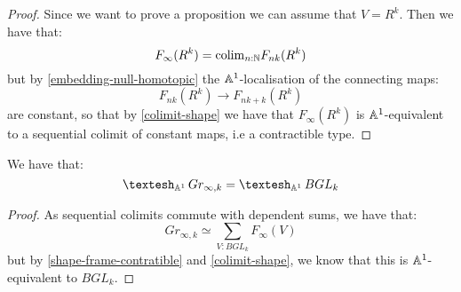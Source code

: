 \begin{proof}
Since we want to prove a proposition we can assume that $V=R^k$. Then we have that:
\[F_\infty(R^k) = \mathrm{colim}_{n:\mathbb{N}} F_{nk}(R^k)\]
but by \cref{embedding-null-homotopic} the $\mathbb{A}^1$-localisation of the connecting maps:
\[F_{nk}(R^k)\to F_{nk + k}(R^k)\]
are constant, so that by \cref{colimit-shape} we have that $F_\infty(R^k)$ is $\mathbb{A}^1$-equivalent to a sequential colimit of constant maps, i.e a contractible type.
\end{proof}

\begin{proposition}
We have that:
\[\shape_{\A^1} Gr_{\infty,k} = \shape_{\A^1} BGL_k\]
\end{proposition}

\begin{proof}
As sequential colimits commute with dependent sums, we have that: 
\[Gr_{\infty,k} \simeq \sum_{V:BGL_k} F_\infty(V)\]
but by \cref{shape-frame-contratible} and \cref{colimit-shape}, we know that this is $\mathbb{A}^1$-equivalent to $BGL_k$.
\end{proof}


